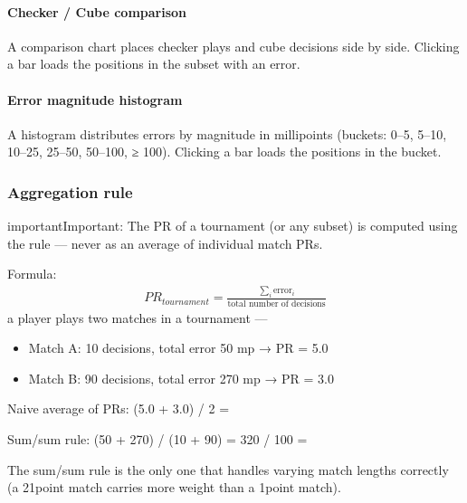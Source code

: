 \documentclass[letterpaper,10pt,english]{sphinxmanual}
\begin{document}
\paragraph{Checker / Cube comparison}
\label{\detokenize{manuel:repartition-checker-cube}}
\sphinxAtStartPar
A comparison chart places checker plays and cube decisions side by side. Clicking a bar loads the positions in the subset with an error.


\paragraph{Error magnitude histogram}
\label{\detokenize{manuel:histogramme-des-magnitudes-d-erreur}}
\sphinxAtStartPar
A histogram distributes errors by magnitude in milli\sphinxhyphen{}points (buckets: 0–5, 5–10, 10–25, 25–50, 50–100, ≥ 100). Clicking a bar loads the positions in the bucket.


\subsubsection{Aggregation rule}
\label{\detokenize{manuel:regle-d-agregation}}
\begin{sphinxadmonition}{important}{Important:}
\sphinxAtStartPar
The PR of a tournament (or any subset) is computed using the  rule — never as an average of individual match PRs.

\sphinxAtStartPar
Formula:
\begin{equation*}
\begin{split}PR_{tournament} = \frac{\sum_{i} \text{error}_i}{\text{total number of decisions}}\end{split}
\end{equation*}
\sphinxAtStartPar
{} a player plays two matches in a tournament —
\begin{itemize}
\item {} 
\sphinxAtStartPar
Match A: 10 decisions, total error 50 mp → PR = 5.0

\item {} 
\sphinxAtStartPar
Match B: 90 decisions, total error 270 mp → PR = 3.0

\end{itemize}

\sphinxAtStartPar
Naive average of PRs: (5.0 + 3.0) / 2 =  

\sphinxAtStartPar
Sum/sum rule: (50 + 270) / (10 + 90) = 320 / 100 =  

\sphinxAtStartPar
The sum/sum rule is the only one that handles varying match lengths correctly (a 21\sphinxhyphen{}point match carries more weight than a 1\sphinxhyphen{}point match).
\end{sphinxadmonition}
\end{document}
